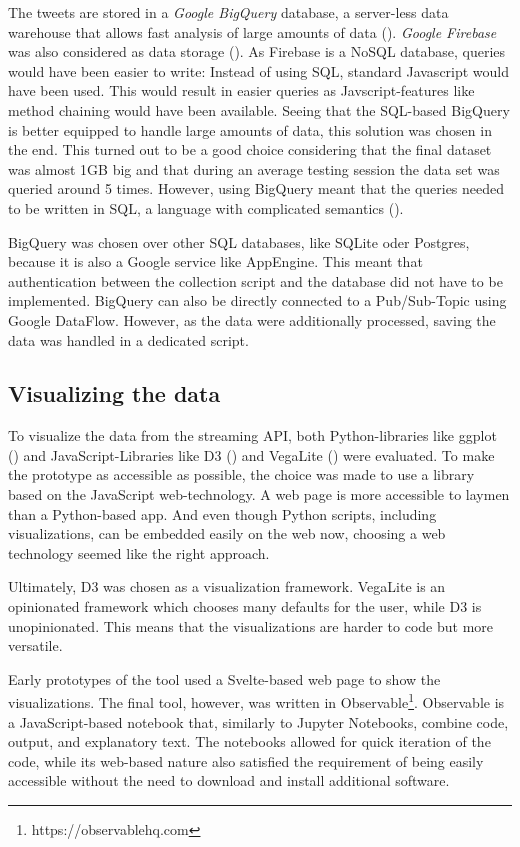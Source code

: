 The tweets are stored in a \emph{Google BigQuery} database, a server-less data warehouse that allows fast analysis of large amounts of data (\cite{google2020b}). \emph{Google Firebase} was also considered as data storage (\cite{google2020c}). As Firebase is a NoSQL database, queries would have been easier to write: Instead of using SQL, standard Javascript would have been used. This would result in easier queries as Javscript-features like method chaining would have been available. Seeing that the SQL-based BigQuery is better equipped to handle large amounts of data, this solution was chosen in the end. This turned out to be a good choice considering that the final dataset was almost 1GB big and that during an average testing session the data set was queried around 5 times. However, using BigQuery meant that the queries needed to be written in SQL, a language with complicated semantics (\cite{slutz1998massive}).

BigQuery was chosen over other SQL databases, like SQLite oder Postgres, because it is also a Google service like AppEngine. This meant that authentication between the collection script and the database did not have to be implemented. BigQuery can also be directly connected to a Pub/Sub-Topic using Google DataFlow. However, as the data were additionally processed, saving the data was handled in a dedicated script. 

\subsection{Visualizing the data}
To visualize the data from the streaming API, both Python-libraries like ggplot (\cite{wickham2016}) and JavaScript-Libraries like D3 (\cite{bostock}) and VegaLite (\cite{uwidl}) were evaluated. To make the prototype as accessible as possible, the choice was made to use a library based on the JavaScript web-technology. A web page is more accessible to laymen than a Python-based app. And even though Python scripts, including visualizations, can be embedded easily on the web now, choosing a web technology seemed like the right approach.

Ultimately, D3 was chosen as a visualization framework. VegaLite is an opinionated framework which chooses many defaults for the user, while D3 is unopinionated. This means that the visualizations are harder to code but more versatile.

Early prototypes of the tool used a Svelte-based web page to show the visualizations. The final tool, however, was written in Observable\footnote{https://observablehq.com}. Observable is a JavaScript-based notebook that, similarly to Jupyter Notebooks, combine code, output, and explanatory text. The notebooks allowed for quick iteration of the code, while its web-based nature also satisfied the requirement of being easily accessible without the need to download and install additional software.

